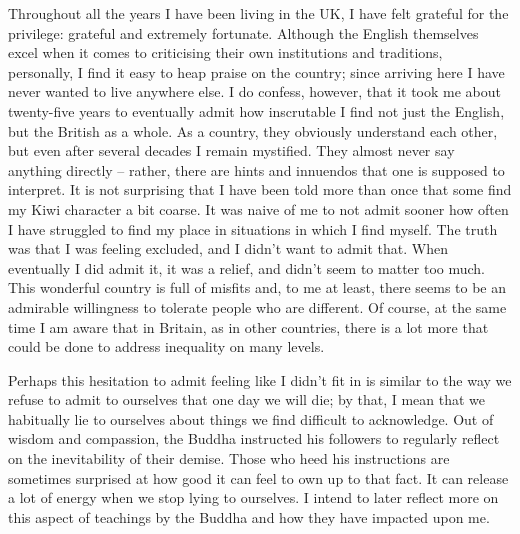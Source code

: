 Throughout all the years I have been living in the UK, I have felt
grateful for the privilege: grateful and extremely fortunate. Although
the English themselves excel when it comes to criticising their own
institutions and traditions, personally, I find it easy to heap praise
on the country; since arriving here I have never wanted to live anywhere
else. I do confess, however, that it took me about twenty-five years to
eventually admit how inscrutable I find not just the English, but the
British as a whole. As a country, they obviously understand each other,
but even after several decades I remain mystified. They almost never say
anything directly -- rather, there are hints and innuendos that one is
supposed to interpret. It is not surprising that I have been told more
than once that some find my Kiwi character a bit coarse. It was naive of
me to not admit sooner how often I have struggled to find my place in
situations in which I find myself. The truth was that I was feeling
excluded, and I didn't want to admit that. When eventually I did admit
it, it was a relief, and didn't seem to matter too much. This wonderful
country is full of misfits and, to me at least, there seems to be an
admirable willingness to tolerate people who are different. Of course,
at the same time I am aware that in Britain, as in other countries,
there is a lot more that could be done to address inequality on many
levels.

Perhaps this hesitation to admit feeling like I didn't fit in is similar
to the way we refuse to admit to ourselves that one day we will die; by
that, I mean that we habitually lie to ourselves about things we find
difficult to acknowledge. Out of wisdom and compassion, the Buddha
instructed his followers to regularly reflect on the inevitability of
their demise. Those who heed his instructions are sometimes surprised at
how good it can feel to own up to that fact. It can release a lot of
energy when we stop lying to ourselves. I intend to later reflect more
on this aspect of teachings by the Buddha and how they have impacted
upon me.


